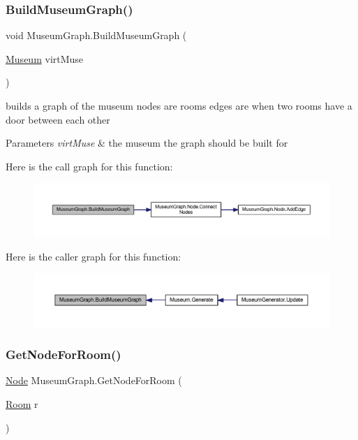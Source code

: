 \subsubsection{\texorpdfstring{Build\+Museum\+Graph()}{BuildMuseumGraph()}}
{\footnotesize\ttfamily void Museum\+Graph.\+Build\+Museum\+Graph (\begin{DoxyParamCaption}\item[{\mbox{\hyperlink{class_museum}{Museum}}}]{virt\+Muse }\end{DoxyParamCaption})}



builds a graph of the museum nodes are rooms edges are when two rooms have a door between each other 


\begin{DoxyParams}{Parameters}
{\em virt\+Muse} & the museum the graph should be built for\\
\hline
\end{DoxyParams}
Here is the call graph for this function\+:
\nopagebreak
\begin{figure}[H]
\begin{center}
\leavevmode
\includegraphics[width=350pt]{class_museum_graph_a36a26248bb9c304f8e67c60eb6d517f5_cgraph}
\end{center}
\end{figure}
Here is the caller graph for this function\+:
\nopagebreak
\begin{figure}[H]
\begin{center}
\leavevmode
\includegraphics[width=350pt]{class_museum_graph_a36a26248bb9c304f8e67c60eb6d517f5_icgraph}
\end{center}
\end{figure}
\mbox{\label{class_museum_graph_a82509a5eb8dd2020aaee17261bedb974}} 
\subsubsection{\texorpdfstring{Get\+Node\+For\+Room()}{GetNodeForRoom()}}
{\footnotesize\ttfamily \mbox{\hyperlink{class_museum_graph_1_1_node}{Node}} Museum\+Graph.\+Get\+Node\+For\+Room (\begin{DoxyParamCaption}\item[{\mbox{\hyperlink{class_room}{Room}}}]{r }\end{DoxyParamCaption})}



